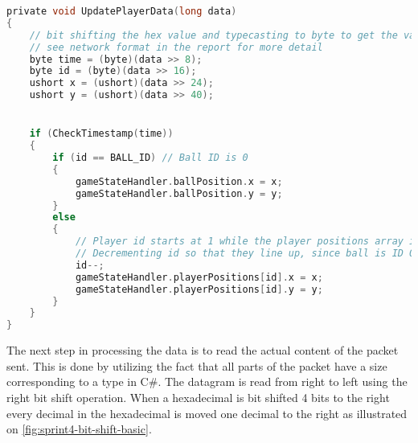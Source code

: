 \begin{lstlisting}[caption={Updating player data in UDP client}, captionpos=b,language=C,label={lst:updateplayerdata}]
private void UpdatePlayerData(long data)
{
    // bit shifting the hex value and typecasting to byte to get the values.
    // see network format in the report for more detail
    byte time = (byte)(data >> 8);
    byte id = (byte)(data >> 16);
    ushort x = (ushort)(data >> 24);
    ushort y = (ushort)(data >> 40);


    if (CheckTimestamp(time))
    {
        if (id == BALL_ID) // Ball ID is 0
        {
            gameStateHandler.ballPosition.x = x;
            gameStateHandler.ballPosition.y = y;
        }
        else
        {
            // Player id starts at 1 while the player positions array is 0 indexed.
            // Decrementing id so that they line up, since ball is ID 0.
            id--;
            gameStateHandler.playerPositions[id].x = x;
            gameStateHandler.playerPositions[id].y = y;
        }
    }
}
\end{lstlisting}
\noindent
The next step in processing the data is to read the actual content of the packet sent.
This is done by utilizing the fact that all parts of the packet have a size corresponding to a type in C\#.
The datagram is read from right to left using the right bit shift operation.
When a hexadecimal is bit shifted 4 bits to the right every decimal in the hexadecimal is moved one decimal to the right as illustrated on \autoref{fig:sprint4-bit-shift-basic}.

